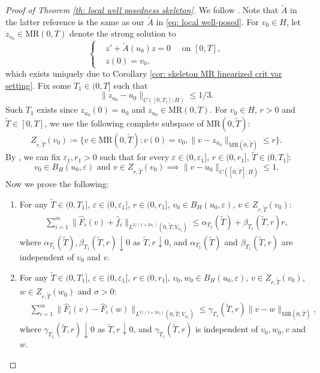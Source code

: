 \documentclass{amsart}
\renewcommand{\MR}{\mathrm{MR}}
\newcommand{\<}{\langle}
\newcommand{\?}{\rangle}
\theoremstyle{plain}
\theoremstyle{remark}
\theoremstyle{plain}
\numberwithin{equation}{section}
\newcommand{\eps}{\varepsilon}
\begin{document}
\begin{proof}[Proof of Theorem \ref{th: local well posedness skeleton}] 
We follow \cite[\S3.2]{TV24}. Note that $\tilde{A}$ in the latter reference is the same as our $\breve{A}$ in \eqref{eq: local well-posed}. 
  For $v_0\in H$,  let $z_{v_0}\in \MR(0,T)$ denote the strong solution to  
\begin{equation}\label{eq:def z_v_0}
  \begin{cases}
    &z'+\breve{A}(u_0)z=0\quad \text{ on } [0,T], \\
    &z(0)=v_0, 
  \end{cases}
\end{equation}
which exists uniquely due to Corollary \ref{cor: skeleton MR linearized crit var setting}.  
Fix some $T_1\in(0,T]$ such that
\begin{equation*} 
  \|z_{u_0}-u_0\|_{C([0,T_1];H)}\leq 1/3. 
\end{equation*} 
Such $T_1$ exists since $z_{u_0}(0)=u_0$ and $z_{u_0}\in \MR(0,T)$. 
For $v_0\in H$, $r>0$ and $\tilde{T}\in[0,T]$, we use the following complete subspace of $\MR(0,\tilde{T})$: 
\begin{equation*} 
Z_{r,\tilde{T}}(v_0)\coloneqq \{v\in \MR(0,\tilde{T}):v(0)=v_0, \|v-z_{u_0}\|_{\MR(0,\tilde{T})}\leq r\}.
\end{equation*}
By \cite[Lem.\ 3.10]{TV24}, we can fix $\eps_1,r_1>0$ such that for every  $\eps\in(0,\eps_1]$, $r\in(0,r_1]$, $\tilde{T}\in(0,T_1]$: 
\begin{equation}\label{eq:eps1 r1 property}
   v_0\in B_H(u_0,\eps) \text{ and }v\in Z_{r,\tilde{T}}(v_0)\implies \|v-u_0\|_{C([0,\tilde{T}];H)}\leq 1.  
\end{equation}
Now we prove the following: 
\begin{enumerate}[label=\textit{(\roman*)},ref=\textit{(\roman*)}]
  \item \label{it: estimate tilde f v}  For any  $\tilde{T}\in(0,T_1]$, $\eps\in(0,\eps_1]$, $r\in(0,r_1]$, $v_0\in B_H(u_0,\eps)$, $v\in Z_{r,\tilde{T}}(v_0)$:
\begin{align*}
&\textstyle{\sum_{i=1}^m}\| \hat{F}_i(v)+\hat{f}_i\|_{L^{2/(1+2\alpha_i)}(0,\tilde{T};V_{\alpha_i})}\leq \alpha_{T_1}(\tilde{T})+\beta_{T_1}(\tilde{T},r)r,  
\end{align*}
  where $\alpha_{T_1}(\tilde{T}),\beta_{T_1}(\tilde{T},r)\downarrow 0$ as $\tilde{T},r\downarrow0$, and $\alpha_{T_1}(\tilde{T})$ and $\beta_{T_1}(\tilde{T},r)$ are independent of $v_0$ and $v$.
\item\label{it: estimate tilde f v-w} For any $\tilde{T}\in(0,T_1]$, $\eps\in(0,\eps_1]$, $r\in(0,r_1]$, $v_0, w_0\in B_H(u_0,\eps)$, $v\in Z_{r,\tilde{T}}(v_0)$, $w\in Z_{r,\tilde{T}}(w_0)$ and $\sigma>0$:
\begin{align*} 
&\textstyle{\sum_{i=1}^m}\|\hat{F}_i(v)-\hat{F}_i(w)\|_{L^{2/(1+2\alpha_i)}(0,\tilde{T};V_{\alpha_i})} \leq \gamma_{T_1}(\tilde{T},r) \|v-w\|_{\MR(0,\tilde{T})}, 
\end{align*}
where $\gamma_{T_1}(\tilde{T},r)\downarrow 0$ as $\tilde{T},r\downarrow0$, and  $\gamma_{T_1}(\tilde{T},r)$ is independent of $v_0,w_0,v$ and $w$.
\end{enumerate}



\end{proof}
\end{document}
